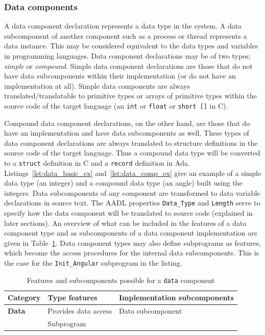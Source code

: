 \subsubsection{Data components} A data component declaration
represents a data type in the system. A data subcomponent of another
component such as a process or thread represents a data instance. This
may be considered equivalent to the data types and variables in
programming languages. Data component declarations may be of two
types; \emph{simple} or \emph{compound}. Simple data component
declarations are those that do not have data subcomponents within
their implementation (or do not have an implementation at all). Simple
data components are always translated/translatable to primitive types
or arrays of primitive types within the source code of the target
language (an \texttt{int} or \texttt{float} or \texttt{short []} in
C).

Compound data component declarations, on the other hand, are those
that do have an implementation and have data subcomponents as
well. These types of data component declarations are always translated
to structure definitions in the source code of the target
language. Thus a compound data type will be converted to a
\texttt{struct} definition in C and a \texttt{record} definition in
Ada. Listings~\ref{lst:data_basic_ex} and~\ref{lst:data_comp_ex} give
an example of a simple data type (an integer) and a compound data type
(an angle) built using the integers. Data subcomponents of any
component are transformed to data variable declarations in source
text. The AADL properties \texttt{Data\_Type} and \texttt{Length}
serve to specify how the data component will be translated to source
code (explained in later sections). An overview of what can be
included in the features of a data component type and as subcomponents
of a data component implementation are given in
Table~\ref{tab:data_rules}. Data component types may also define
subprograms as features, which become the access procedures for the
internal data subcomponents. This is the case for the
\texttt{Init\_Angular} subprogram in the listing.

\begin{table}
\centering
\begin{tabular}{|l|l|l|}
\hline
\textbf{Category} & \textbf{Type features} & \textbf{Implementation
  subcomponents} \\
\hline
\textbf{Data} & Provides data access & Data subcomponent\\
 & Subprogram & \\
\hline
\end{tabular}
\caption{Features and subcomponents possible for a \texttt{data}
  component}
\label{tab:data_rules}
\end{table}

